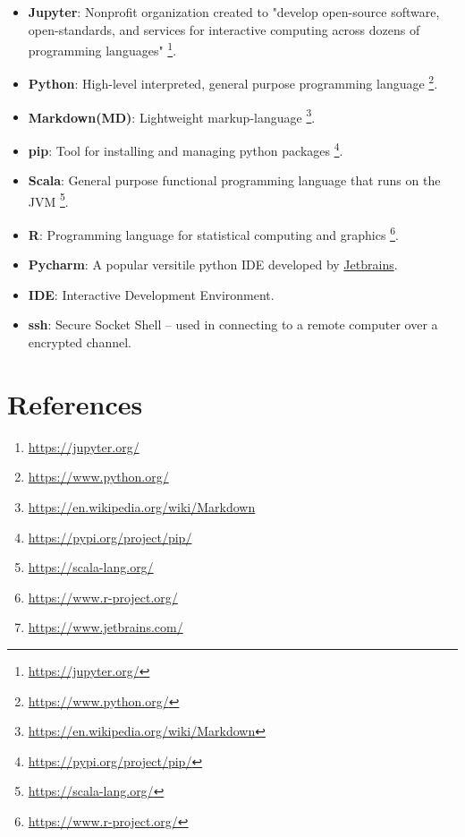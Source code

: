 \documentclass[pdftex,12pt]{artikel3}
\begin{document}
\begin{itemize}[label={}]
\item {\bf Jupyter}: Nonprofit organization created to "develop open-source software, open-standards, and services for interactive computing across dozens of programming languages" \footnote{\url{ https://jupyter.org/}}.\\
\item {\bf Python}: High-level interpreted, general purpose programming language \footnote{\url{ https://www.python.org/}}.\\
\item {\bf Markdown(MD)}: Lightweight markup-language \footnote{\url{https://en.wikipedia.org/wiki/Markdown}}.\\
\item {\bf pip}: Tool for installing and managing python packages \footnote{\url{ https://pypi.org/project/pip/}}.\\
\item {\bf Scala}: General purpose functional programming language that runs on the JVM \footnote{\url{ https://scala-lang.org/}}.\\
\item {\bf R}: Programming language for statistical computing and graphics \footnote{\url{ https://www.r-project.org/}}.\\
\item {\bf Pycharm}: A popular versitile python IDE developed by \href{https://www.jetbrains.com/}{Jetbrains}.\\
\item {\bf IDE}: Interactive Development Environment.\\
\item {\bf ssh}: Secure Socket Shell -- used in connecting to a remote computer over a encrypted channel.\\



\end{itemize}

\newpage

\section{References}

\begin{enumerate}
\item
\url{https://jupyter.org/}
\item
\url{https://www.python.org/}
\item
\url{https://en.wikipedia.org/wiki/Markdown}
\item
\url{https://pypi.org/project/pip/}
\item
\url{https://scala-lang.org/}
\item
\url{https://www.r-project.org/}
\item
\url{https://www.jetbrains.com/}
\end{enumerate}

\newpage

\printindex
\end{document}
